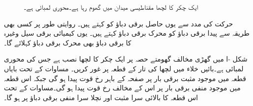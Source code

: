 \begin{figure}
\begin{subfigure}{0.45\textwidth}
\caption{}
\end{subfigure}
\caption{ایک چکر کا لچھا مقناطیسی میدان میں گھوم رہا ہے۔محوری لمبائی  ہے۔}
\label{شکل_گھومتے_مشین_ایک_چکر_کی_پیدا_دباو}
\end{figure}

 حرکت کی مدد سے یوں حاصل برقی دباؤ کو   کہتے ہیں۔ روایتی طور پر کسی بھی طریقہ سے پیدا برقی دباؤ کو محرک برقی دباؤ کہتے ہیں۔ یوں کیمیائی برقی سیل وغیرہ کا برقی دباؤ بھی محرک برقی دباؤ کہلائے  گا۔

شکل -ا میں گھڑی مخالف گھومتے حصہ پر ایک چکر کا لچھا نصب ہے جس کی محوری لمبائی  ہے۔بائیں خلاء میں لچھا کی  تار کے قطعہ پر غور کریں۔ مساوات   کے تحت بایاں قطعہ میں موجود مثبت برقی بار پر صفحہ کے   باہر رخ قوت پیدا ہو گی جبکہ اس قطعہ میں موجود منفی برقی بار پر اس کے مخالف رخ قوت پیدا ہو گی۔مساوات   کے تحت اس قطعہ کا بالائی  سرا مثبت   اور نچلا سرا منفی برقی دباؤ پر ہو گا۔

